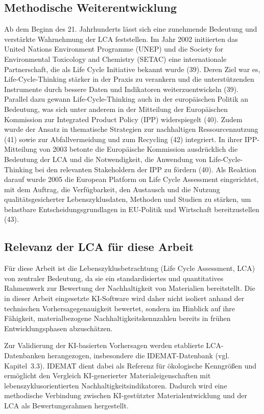 \subsection{Methodische Weiterentwicklung}

Ab dem Beginn des 21. Jahrhunderts lässt sich eine zunehmende Bedeutung und verstärkte Wahrnehmung der LCA feststellen.  Im Jahr 2002 initiierten das United Nations Environment Programme (UNEP) und die Society for Environmental Toxicology and Chemistry (SETAC) eine internationale Partnerschaft, die als Life Cycle Initiative bekannt wurde (39). Deren Ziel war es, Life-Cycle-Thinking stärker in der Praxis zu verankern und die unterstützenden Instrumente durch bessere Daten und Indikatoren weiterzuentwickeln (39). Parallel dazu gewann Life-Cycle-Thinking auch in der europäischen Politik an Bedeutung, was sich unter anderem in der Mitteilung der Europäischen Kommission zur Integrated Product Policy (IPP) widerspiegelt (40). Zudem wurde der Ansatz in thematische Strategien zur nachhaltigen Ressourcennutzung (41) sowie zur Abfallvermeidung und zum Recycling (42) integriert. In ihrer IPP-Mitteilung von 2003 betonte die Europäische Kommission ausdrücklich die Bedeutung der LCA und die Notwendigkeit, die Anwendung von Life-Cycle-Thinking bei den relevanten Stakeholdern der IPP zu fördern (40). Als Reaktion darauf wurde 2005 die European Platform on Life Cycle Assessment eingerichtet, mit dem Auftrag, die Verfügbarkeit, den Austausch und die Nutzung qualitätsgesicherter Lebenszyklusdaten, Methoden und Studien zu stärken, um belastbare Entscheidungsgrundlagen in EU-Politik und Wirtschaft bereitzustellen (43). \cite{guinee2011life}

\subsection{Relevanz der LCA für diese Arbeit}

Für diese Arbeit ist die Lebenszyklusbetrachtung (Life Cycle Assessment, LCA) von zentraler Bedeutung, da sie ein standardisiertes und quantitatives Rahmenwerk zur Bewertung der Nachhaltigkeit von Materialien bereitstellt. Die in dieser Arbeit eingesetzte KI-Software wird daher nicht isoliert anhand der technischen Vorhersagegenauigkeit bewertet, sondern im Hinblick auf ihre Fähigkeit, materialbezogene Nachhaltigkeitskennzahlen bereits in frühen Entwicklungsphasen abzuschätzen.

Zur Validierung der KI-basierten Vorhersagen werden etablierte LCA-Datenbanken herangezogen, insbesondere die IDEMAT-Datenbank (vgl. Kapitel~3.3). IDEMAT dient dabei als Referenz für ökologische Kenngrößen und ermöglicht den Vergleich KI-generierter Materialeigenschaften mit lebenszyklusorientierten Nachhaltigkeitsindikatoren. Dadurch wird eine methodische Verbindung zwischen KI-gestützter Materialentwicklung und der LCA als Bewertungsrahmen hergestellt.


